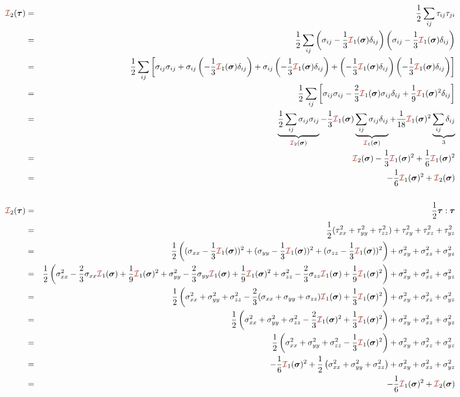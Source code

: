 \begin{eqnarray}
{\III}_2(\bm \tau)
&=& \frac12 \sum_{ij} \tau_{ij}\tau_{ji}  \nn\\
&=& \frac12 \sum_{ij} 
\left(\sigma_{ij}-\frac13 {\III}_1(\bm\sigma) \delta_{ij}\right)
\left(\sigma_{ij}-\frac13 {\III}_1(\bm\sigma) \delta_{ij}\right) \nn\\
&=& \frac12 \sum_{ij} 
\left[
\sigma_{ij}\sigma_{ij} 
+
\sigma_{ij}
\left(-\frac13 {\III}_1(\bm\sigma) \delta_{ij}\right)
+
\sigma_{ij}
\left(-\frac13 {\III}_1(\bm\sigma) \delta_{ij}\right)
+
\left(-\frac13 {\III}_1(\bm\sigma) \delta_{ij}\right)
\left(-\frac13 {\III}_1(\bm\sigma) \delta_{ij}\right) 
\right] \nn\\
&=& \frac12 \sum_{ij} 
\left[
\sigma_{ij}\sigma_{ij} 
-\frac23
{\III}_1(\bm\sigma) 
\sigma_{ij}
\delta_{ij}
+
\frac19 {\III}_1(\bm\sigma)^2 \delta_{ij}
\right] \nn\\
&=& 
\underbrace{\frac12 \sum_{ij} \sigma_{ij}\sigma_{ij} }_{{\III}_2(\bm\sigma)}
-\frac13
{\III}_1(\bm\sigma) 
\underbrace{\sum_{ij}  \sigma_{ij}  \delta_{ij}}_{{\III}_1(\bm\sigma)}
+
\frac{1}{18}
{\III}_1(\bm\sigma)^2 
\underbrace{\sum_{ij} \delta_{ij}}_{3} \nn\\
&=& {\III}_2(\bm\sigma)
- \frac13  {\III}_1(\bm\sigma)^2 + \frac16  {\III}_1(\bm\sigma)^2 \nn\\
&=& -\frac16  {\III}_1(\bm\sigma)^2 +  {\III}_2(\bm\sigma)
\nn\\
\nn\\
{\III}_2(\bm\tau) 
&=& \frac12 \bm\tau:\bm\tau \nn\\
&=& \frac12 ( \tau_{xx}^2 + \tau_{yy}^2 +\tau_{zz}^2)  + \tau_{xy}^2+ \tau_{xz}^2+ \tau_{yz}^2 \nn\\
&=& \frac12 \left(
(\sigma_{xx}-\frac13{\III}_1(\bm\sigma))^2 + 
(\sigma_{yy}-\frac13{\III}_1(\bm\sigma))^2 + 
(\sigma_{zz}-\frac13{\III}_1(\bm\sigma))^2  
\right)
+ \sigma_{xy}^2+ \sigma_{xz}^2+ \sigma_{yz}^2 \nn\\
&=& \frac12 \left(
\sigma_{xx}^2-\frac23\sigma_{xx}{\III}_1(\bm\sigma) + \frac19 {\III}_1(\bm\sigma)^2+
\sigma_{yy}^2-\frac23\sigma_{yy}{\III}_1(\bm\sigma) + \frac19 {\III}_1(\bm\sigma)^2+
\sigma_{zz}^2-\frac23\sigma_{zz}{\III}_1(\bm\sigma) + \frac19 {\III}_1(\bm\sigma)^2
\right)
+ \sigma_{xy}^2+ \sigma_{xz}^2+ \sigma_{yz}^2 \nn\\
&=& \frac12 \left(
\sigma_{xx}^2 + \sigma_{yy}^2 + \sigma_{zz}^2
-\frac23(\sigma_{xx}+\sigma_{yy}+\sigma_{zz})
{\III}_1(\bm\sigma) + \frac13 {\III}_1(\bm\sigma)^2
\right)
+ \sigma_{xy}^2+ \sigma_{xz}^2+ \sigma_{yz}^2 \nn\\
&=& \frac12 \left(
\sigma_{xx}^2 + \sigma_{yy}^2 + \sigma_{zz}^2
-\frac23
{\III}_1(\bm\sigma)^2 + \frac13 {\III}_1(\bm\sigma)^2
\right)
+ \sigma_{xy}^2+ \sigma_{xz}^2+ \sigma_{yz}^2 \nn\\
&=& 
\frac12 \left(
\sigma_{xx}^2 + \sigma_{yy}^2 + \sigma_{zz}^2
-\frac13 {\III}_1(\bm\sigma)^2 
\right)
+ \sigma_{xy}^2+ \sigma_{xz}^2+ \sigma_{yz}^2 \nn\\
&=&
-\frac16 {\III}_1(\bm\sigma)^2 + 
\frac12 \left(
\sigma_{xx}^2 + \sigma_{yy}^2 + \sigma_{zz}^2
\right)
+ \sigma_{xy}^2+ \sigma_{xz}^2+ \sigma_{yz}^2 \nn\\
&=&
-\frac16 {\III}_1(\bm\sigma)^2 + {\III}_2(\bm\sigma)
\end{eqnarray}
